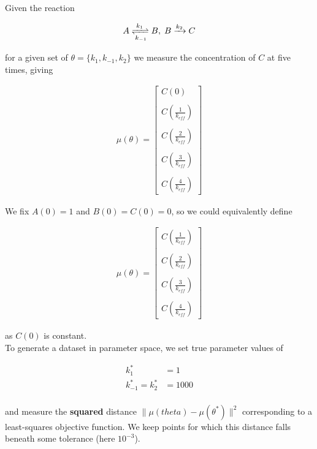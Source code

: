 \documentclass[11pt]{article}
\begin{document}
Given the reaction

\begin{align*}
  A \xrightleftharpoons[k_{-1}]{k_1} B, \; B \xrightarrow[]{k_2} C
\end{align*}

for a given set of $\theta = \{k_1, k_{-1}, k_2\}$ we measure the concentration
of $C$ at five times, giving

\begin{align*}
  \mu(\theta) = \begin{bmatrix} C(0) \\ \\ C(\frac{1}{k_{eff}}) \\ \\
    C(\frac{2}{k_{eff}}) \\ \\ C(\frac{3}{k_{eff}}) \\ \\
    C(\frac{4}{k_{eff}}) \end{bmatrix}
\end{align*}

We fix $A(0) = 1$ and $B(0) = C(0) = 0$, so we could equivalently define

\begin{align*}
  \mu(\theta) = \begin{bmatrix} C(\frac{1}{k_{eff}}) \\ \\
    C(\frac{2}{k_{eff}}) \\ \\ C(\frac{3}{k_{eff}}) \\ \\
    C(\frac{4}{k_{eff}}) \end{bmatrix}
\end{align*}

as $C(0)$ is constant. \\

To generate a dataset in parameter space, we set true parameter values
of 

\begin{align*}
  k_1^* &= 1 \\
  k_{-1}^* = k_2^* &= 1000 \\
\end{align*}

and measure the \textbf{squared} distance $\| \mu(theta) -
\mu(\theta^*) \|^2$ corresponding to a least-squares objective
function. We keep points for which this distance falls beneath some
tolerance (here $10^{-3}$).
\end{document}
